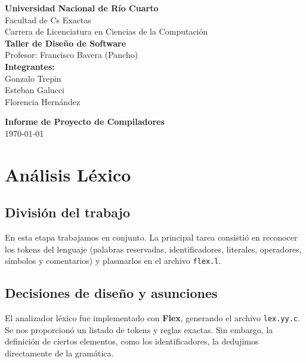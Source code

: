 \documentclass[12pt,a4paper]{article}
\begin{document}
\begin{titlepage}
    \centering
    \vspace*{2cm}

    
    {\Huge \textbf{Universidad Nacional de Río Cuarto}}\\[0.5cm]
    {\Large Facultad de Cs Exactas}\\[0.5cm]
    {\Large Carrera de Licenciatura en Ciencias de la Computación}\\[2cm]
    
    {\LARGE \textbf{Taller de Diseño de Software}}\\[0.5cm]
    {\large Profesor: Francisco Bavera (Pancho)}\\[2cm]
    
    \textbf{Integrantes:}\\[0.2cm]
    Gonzalo Trepin\\
    Esteban Galucci\\
    Florencia Hernández\\[2cm]

    \vfill

    \textbf{Informe de Proyecto de Compiladores}\\[0.5cm]
    \today
\end{titlepage}

\tableofcontents
\newpage


\section{Análisis Léxico}

\subsection{División del trabajo}
En esta etapa trabajamos en conjunto. La principal tarea consistió en reconocer los tokens del lenguaje 
(palabras reservadas, identificadores, literales, operadores, símbolos y comentarios) y plasmarlos en el archivo \texttt{flex.l}.

\subsection{Decisiones de diseño y asunciones}
El analizador léxico fue implementado con \textbf{Flex}, generando el archivo \texttt{lex.yy.c}.
Se nos proporcionó un listado de tokens y reglas exactas. Sin embargo, la definición de ciertos elementos, 
como los identificadores, la dedujimos directamente de la gramática.
\end{document}

